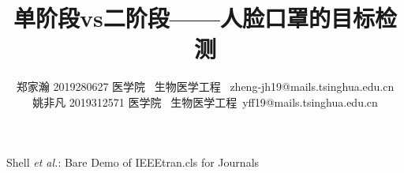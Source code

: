 \documentclass[journal,transmag]{IEEEtran}
\begin{document}
%
\title{单阶段vs二阶段——人脸口罩的目标检测}




\author{郑家瀚 2019280627 医学院 \ 生物医学工程 \ zheng-jh19@mails.tsinghua.edu.cn\\
姚非凡 2019312571 医学院 \ 生物医学工程\ yff19@mails.tsinghua.edu.cn}%



%
{Shell \MakeLowercase{\textit{et al.}}: Bare Demo of IEEEtran.cls for Journals}
% 







\end{document}
